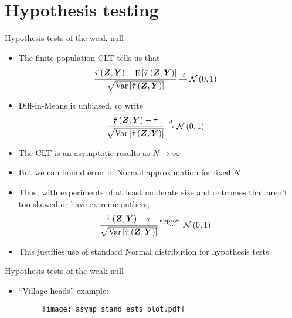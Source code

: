 \documentclass[table, xcolor = {dvipsnames}, 9pt]{beamer}
\theoremstyle{plain}
\DeclareMathOperator{\E}{\rm{E}}
\DeclareMathOperator{\Var}{\rm{Var}}
\begin{document}
\section{Hypothesis testing}
\begin{frame}{Hypothesis tests of the weak null}
\begin{itemize}
\item The finite population CLT tells us that 
\begin{align*}
\cfrac{\hat{\tau}\left(\bm{Z}, \bm{Y}\right) - \E\left[\hat{\tau}\left(\bm{Z}, \bm{Y}\right)\right]}{\sqrt{\Var\left[\hat{\tau}\left(\bm{Z}, \bm{Y}\right)\right]}} & \overset{d}{\to} \mathcal{N}\left(0, 1\right)
\end{align*}  \pause 
\item Diff-in-Means is unbiased, so write
\begin{align*}
\cfrac{\hat{\tau}\left(\bm{Z}, \bm{Y}\right) - \tau}{\sqrt{\Var\left[\hat{\tau}\left(\bm{Z}, \bm{Y}\right)\right]}} & \overset{d}{\to} \mathcal{N}\left(0, 1\right)
\end{align*} \pause
\item The CLT is an asymptotic results as $N \to \infty$
\item But we can bound error of Normal approximation for fixed $N$ \pause
\item Thus, with experiments of at least moderate size and outcomes that aren't too skewed or have extreme outliers,
\begin{align*}
\cfrac{\hat{\tau}\left(\bm{Z}, \bm{Y}\right) - \tau}{\sqrt{\Var\left[\hat{\tau}\left(\bm{Z}, \bm{Y}\right)\right]}} & \overset{\text{approx.}}{\sim} \mathcal{N}\left(0, 1\right)
\end{align*} \pause
\item This justifies use of standard Normal distribution for hypothesis tests
\end{itemize}
\end{frame}
\begin{frame}{Hypothesis tests of the weak null}
\vfill
\begin{itemize} \vfill
\item ``Village heads'' example: \vfill
\begin{figure}[H]
\texttt{[image: asymp\_stand\_ests\_plot.pdf]}
\end{figure}
\end{itemize}
\vfill
\end{frame}
\end{document}
